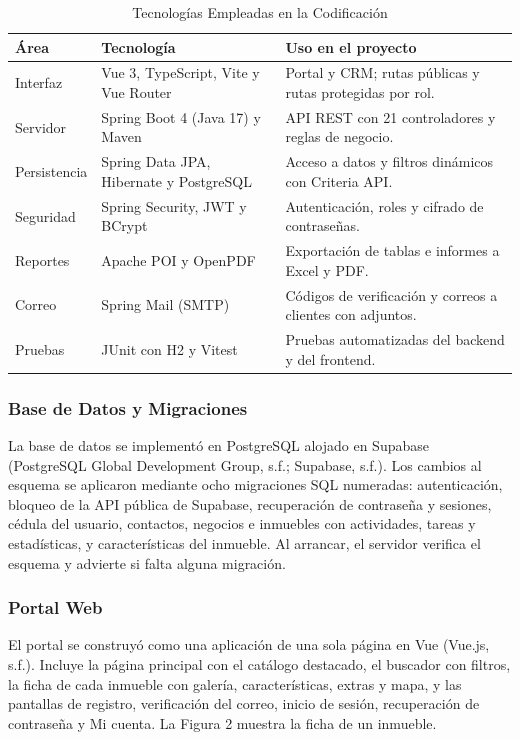\documentclass[stu,12pt,letterpaper,donotrepeattitle,floatsintext]{apa7}
\begin{document}
\begin{table}[htbp]
\caption{Tecnologías Empleadas en la Codificación}
\small
\begin{tabularx}{\linewidth}{>{\hsize}L>{\hsize}L>{\hsize}L}
\toprule
\textbf{Área} & \textbf{Tecnología} & \textbf{Uso en el proyecto} \\
\midrule
Interfaz & Vue 3, TypeScript, Vite y Vue Router & Portal y CRM; rutas públicas y rutas protegidas por rol. \\
Servidor & Spring Boot 4 (Java 17) y Maven & API REST con 21 controladores y reglas de negocio. \\
Persistencia & Spring Data JPA, Hibernate y PostgreSQL & Acceso a datos y filtros dinámicos con Criteria API. \\
Seguridad & Spring Security, JWT y BCrypt & Autenticación, roles y cifrado de contraseñas. \\
Reportes & Apache POI y OpenPDF & Exportación de tablas e informes a Excel y PDF. \\
Correo & Spring Mail (SMTP) & Códigos de verificación y correos a clientes con adjuntos. \\
Pruebas & JUnit con H2 y Vitest & Pruebas automatizadas del backend y del frontend. \\
\bottomrule
\end{tabularx}
\end{table}

\subsubsection{Base de Datos y Migraciones}

La base de datos se implementó en PostgreSQL alojado en Supabase (PostgreSQL Global Development Group, s.f.; Supabase, s.f.). Los cambios al esquema se aplicaron mediante ocho migraciones SQL numeradas: autenticación, bloqueo de la API pública de Supabase, recuperación de contraseña y sesiones, cédula del usuario, contactos, negocios e inmuebles con actividades, tareas y estadísticas, y características del inmueble. Al arrancar, el servidor verifica el esquema y advierte si falta alguna migración.

\subsubsection{Portal Web}

El portal se construyó como una aplicación de una sola página en Vue (Vue.js, s.f.). Incluye la página principal con el catálogo destacado, el buscador con filtros, la ficha de cada inmueble con galería, características, extras y mapa, y las pantallas de registro, verificación del correo, inicio de sesión, recuperación de contraseña y \guillemotleft{}Mi cuenta\guillemotright{}. La Figura 2 muestra la ficha de un inmueble.
\end{document}
